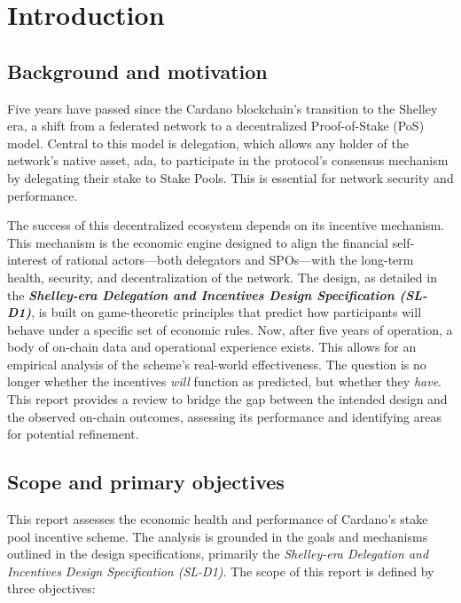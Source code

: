 \documentclass[11pt, letterpaper]{article}
\begin{document}
\newpage
\section{Introduction}

\subsection{Background and motivation}
Five years have passed since the Cardano blockchain's transition to the Shelley
era, a shift from a federated network to a decentralized Proof-of-Stake (PoS)
model. Central to this model is delegation, which allows any holder of the
network's native asset, ada, to participate in the protocol's consensus
mechanism by delegating their stake to Stake Pools. This is essential for
network security and performance.

The success of this decentralized ecosystem depends on its incentive mechanism.
This mechanism is the economic engine designed to align the financial
self-interest of rational actors—both delegators and SPOs—with the long-term
health, security, and decentralization of the network. The design, as detailed
in the \textit{\textbf{Shelley-era Delegation and Incentives Design
		Specification (SL-D1)}}, is built on game-theoretic principles that predict how
participants will behave under a specific set of economic rules. Now, after
five years of operation, a body of on-chain data and operational experience
exists. This allows for an empirical analysis of the scheme's real-world
effectiveness. The question is no longer whether the incentives \textit{will}
function as predicted, but whether they \textit{have}. This report provides a
review to bridge the gap between the intended design and the observed on-chain
outcomes, assessing its performance and identifying areas for potential
refinement.

\subsection{Scope and primary objectives}
This report assesses the economic health and performance of Cardano's stake
pool incentive scheme. The analysis is grounded in the goals and mechanisms
outlined in the design specifications, primarily the \textit{Shelley-era
	Delegation and Incentives Design Specification (SL-D1)}. The scope of this
report is defined by three objectives:
\end{document}

